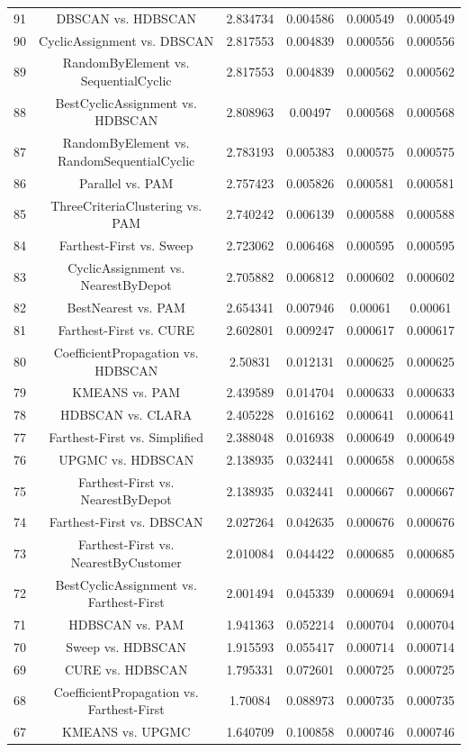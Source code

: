 \documentclass[a4paper,10pt]{article}
\begin{document}
\begin{landscape}
\begin{table}[!htp]
\begin{tabular}{cccccc}
91&DBSCAN vs. HDBSCAN&2.834734&0.004586&0.000549&0.000549\\
90&CyclicAssignment vs. DBSCAN&2.817553&0.004839&0.000556&0.000556\\
89&RandomByElement vs. SequentialCyclic&2.817553&0.004839&0.000562&0.000562\\
88&BestCyclicAssignment vs. HDBSCAN&2.808963&0.00497&0.000568&0.000568\\
87&RandomByElement vs. RandomSequentialCyclic&2.783193&0.005383&0.000575&0.000575\\
86&Parallel vs. PAM&2.757423&0.005826&0.000581&0.000581\\
85&ThreeCriteriaClustering vs. PAM&2.740242&0.006139&0.000588&0.000588\\
84&Farthest-First vs. Sweep&2.723062&0.006468&0.000595&0.000595\\
83&CyclicAssignment vs. NearestByDepot&2.705882&0.006812&0.000602&0.000602\\
82&BestNearest vs. PAM&2.654341&0.007946&0.00061&0.00061\\
81&Farthest-First vs. CURE&2.602801&0.009247&0.000617&0.000617\\
80&CoefficientPropagation vs. HDBSCAN&2.50831&0.012131&0.000625&0.000625\\
79&KMEANS vs. PAM&2.439589&0.014704&0.000633&0.000633\\
78&HDBSCAN vs. CLARA&2.405228&0.016162&0.000641&0.000641\\
77&Farthest-First vs. Simplified&2.388048&0.016938&0.000649&0.000649\\
76&UPGMC vs. HDBSCAN&2.138935&0.032441&0.000658&0.000658\\
75&Farthest-First vs. NearestByDepot&2.138935&0.032441&0.000667&0.000667\\
74&Farthest-First vs. DBSCAN&2.027264&0.042635&0.000676&0.000676\\
73&Farthest-First vs. NearestByCustomer&2.010084&0.044422&0.000685&0.000685\\
72&BestCyclicAssignment vs. Farthest-First&2.001494&0.045339&0.000694&0.000694\\
71&HDBSCAN vs. PAM&1.941363&0.052214&0.000704&0.000704\\
70&Sweep vs. HDBSCAN&1.915593&0.055417&0.000714&0.000714\\
69&CURE vs. HDBSCAN&1.795331&0.072601&0.000725&0.000725\\
68&CoefficientPropagation vs. Farthest-First&1.70084&0.088973&0.000735&0.000735\\
67&KMEANS vs. UPGMC&1.640709&0.100858&0.000746&0.000746\\

\end{tabular}
\end{table}
\end{landscape}
\end{document}
